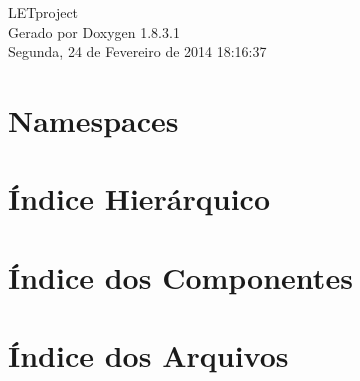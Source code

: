 \documentclass{book}
\begin{document}
\hypersetup{pageanchor=false,citecolor=blue}
\begin{titlepage}
\vspace*{7cm}
\begin{center}
{\Large L\-E\-Tproject }\\
\vspace*{1cm}
{\large Gerado por Doxygen 1.8.3.1}\\
\vspace*{0.5cm}
{\small Segunda, 24 de Fevereiro de 2014 18:16:37}\\
\end{center}
\end{titlepage}
\clearemptydoublepage
{}
\tableofcontents
\clearemptydoublepage
{}
\hypersetup{pageanchor=true,citecolor=blue}
\chapter{Namespaces}

\chapter{Índice Hierárquico}

\chapter{Índice dos Componentes}

\chapter{Índice dos Arquivos}

\end{document}
